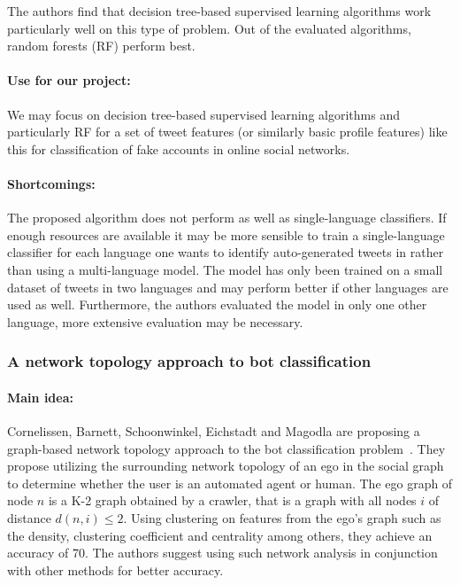 The authors find that decision tree-based supervised learning algorithms work particularly well on this type of problem. Out of the evaluated algorithms, random forests (RF) perform best.

\paragraph{Use for our project:}
We may focus on decision tree-based supervised learning algorithms and particularly RF for a set of tweet features (or similarly basic profile features) like this for classification of fake accounts in online social networks.

\paragraph{Shortcomings:}
The proposed algorithm does not perform as well as single-language classifiers. If enough resources are available it may be more sensible to train a single-language classifier for each language one wants to identify auto-generated tweets in rather than using a multi-language model. The model has only been trained on a small dataset of tweets in two languages and may perform better if other languages are used as well. Furthermore, the authors evaluated the model in only one other language, more extensive evaluation may be necessary.


\subsubsection{A network topology approach to bot classification}

\paragraph{Main idea:}
Cornelissen, Barnett, Schoonwinkel, Eichstadt and Magodla are proposing a graph-based network topology approach to the bot classification problem~\cite{cornelissen2018network}. They propose utilizing the surrounding network topology of an ego in the social graph to determine whether the user is an automated agent or human. The ego graph of node $n$ is a K-2 graph obtained by a crawler, that is a graph with all nodes $i$ of distance $d(n,i) \leq 2$. Using clustering on features from the ego's graph such as the density, clustering coefficient and centrality among others, they achieve an accuracy of 70\text{\%}. The authors suggest using such network analysis in conjunction with other methods for better accuracy. 

